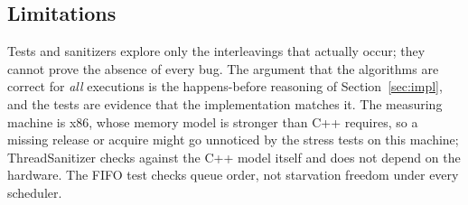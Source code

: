 \subsection{Limitations}

Tests and sanitizers explore only the interleavings that actually occur; they cannot prove the absence of every bug. The argument that the algorithms are correct for \emph{all} executions is the happens-before reasoning of Section~\ref{sec:impl}, and the tests are evidence that the implementation matches it. The measuring machine is x86, whose memory model is stronger than C++ requires, so a missing release or acquire might go unnoticed by the stress tests on this machine; ThreadSanitizer checks against the C++ model itself and does not depend on the hardware. The FIFO test checks queue order, not starvation freedom under every scheduler.
